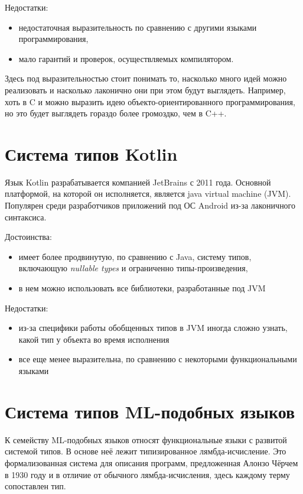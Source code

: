 Недостатки:
\begin{itemize}
    \item недостаточная выразительность по сравнению с другими языками программирования,
    \item мало гарантий и проверок, осуществляемых компилятором.
\end{itemize}

Здесь под выразительностью стоит понимать то, насколько много идей можно реализовать и насколько лаконично они при этом будут выглядеть.
Например, хоть в C и можно выразить идею объекто-ориентированного программирования, но это будет выглядеть гораздо более громоздко, чем в C++.

\section{Система типов Kotlin}
\label{sec:kotlin_type_system}

Язык Kotlin разрабатывается компанией JetBrains с 2011 года.
Основной платформой, на которой он исполняется, является java virtual machine (JVM).
Популярен среди разработчиков приложений под ОС Android\cite{KotlinTypeSpec} из-за лаконичного синтаксиса.

Достоинства:
\begin{itemize}
    \item имеет более продвинутую, по сравнению с Java, систему типов, включающую \textit{nullable types} и ограниченно типы-произведения,
    \item в нем можно использовать все библиотеки, разработанные под JVM
\end{itemize}

Недостатки:
\begin{itemize}
    \item из-за специфики работы обобщенных типов в JVM иногда сложно узнать, какой тип у объекта во время исполнения
    \item все еще менее выразительна, по сравнению с некоторыми функциональными языками
\end{itemize}

\section{Система типов ML-подобных языков}
\label{sec:ml_type_system}

К семейству ML-подобных языков относят функциональные языки с развитой системой типов.
В основе неё лежит типизированное лямбда-исчисление.
Это формализованная система для описания программ, предложенная Алонзо Чёрчем в 1930 году и в отличие от обычного лямбда-исчисления, здесь каждому терму сопоставлен тип.

